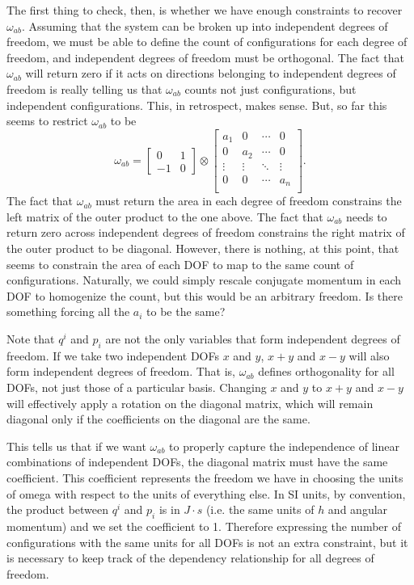 The first thing to check, then, is whether we have enough constraints to recover $\omega_{ab}$. Assuming that the system can be broken up into independent degrees of freedom, we must be able to define the count of configurations for each degree of freedom, and independent degrees of freedom must be orthogonal. The fact that $\omega_{ab}$ will return zero if it acts on directions belonging to independent degrees of freedom is really telling us that $\omega_{ab}$ counts not just configurations, but independent configurations. This, in retrospect, makes sense. But, so far this seems to restrict $\omega_{ab}$ to be
\begin{equation}
	\omega_{ab} = \left[\begin{array}{cc}
		0 & 1 \\
		-1 & 0 
	\end{array} \right] \otimes   \left[ {\begin{array}{cccc}
		a_{1} & 0 & \cdots & 0\\
		0 & a_{2} & \cdots & 0\\
		\vdots & \vdots & \ddots & \vdots\\
		0 & 0 & \cdots & a_{n}\\
\end{array} } \right].
\end{equation}
The fact that $\omega_{ab}$ must return the area in each degree of freedom constrains the left matrix of the outer product to the one above. The fact that $\omega_{ab}$ needs to return zero across independent degrees of freedom constrains the right matrix of the outer product to be diagonal. However, there is nothing, at this point, that seems to constrain the area of each DOF to map to the same count of configurations. Naturally, we could simply rescale conjugate momentum in each DOF to homogenize the count, but this would be an arbitrary freedom. Is there something forcing all the $a_i$ to be the same?

Note that $q^i$ and $p_i$ are not the only variables that form independent degrees of freedom. If we take two independent DOFs $x$ and $y$, $x+y$ and $x-y$ will also form independent degrees of freedom. That is, $\omega_{ab}$ defines orthogonality for all DOFs, not just those of a particular basis. Changing $x$ and $y$ to $x+y$ and $x-y$ will effectively apply a rotation on the diagonal matrix, which will remain diagonal only if the coefficients on the diagonal are the same.

This tells us that if we want $\omega_{ab}$ to properly capture the independence of linear combinations of independent DOFs, the diagonal matrix must have the same coefficient. This coefficient represents the freedom we have in choosing the units of omega with respect to the units of everything else. In SI units, by convention, the product between $q^i$ and $p_i$ is in $J\cdot s$ (i.e. the same units of $h$ and angular momentum) and we set the coefficient to 1. Therefore expressing the number of configurations with the same units for all DOFs is not an extra constraint, but it is necessary to keep track of the dependency relationship for all degrees of freedom.

